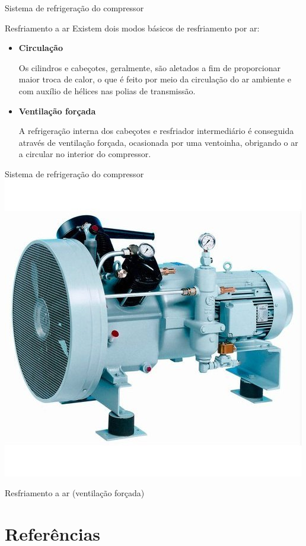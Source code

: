 \begin{frame}{Sistema de refrigeração do compressor}
	\begin{block}{Resfriamento a ar}
		Existem dois modos básicos de resfriamento por ar:
		\begin{itemize}
			\item \textbf{Circulação}
			
			Os cilindros e cabeçotes, geralmente, são aletados a fim de
			proporcionar maior troca de calor, o que é feito por meio da
			circulação do ar ambiente e com auxílio de hélices nas polias de transmissão.
			
			\item \textbf{Ventilação forçada}
			
			A refrigeração interna dos cabeçotes e resfriador intermediário
			é conseguida através de ventilação forçada, ocasionada
			por uma ventoinha, obrigando o ar a circular no interior do
			compressor.
		\end{itemize}
	\end{block}
\end{frame}


\begin{frame}{Sistema de refrigeração do compressor}
	\centering
	\includegraphics[width=0.6\linewidth]{Figuras/Ch12/fig10}
	
	Resfriamento a ar (ventilação forçada)
\end{frame}



\section*{Referências}
